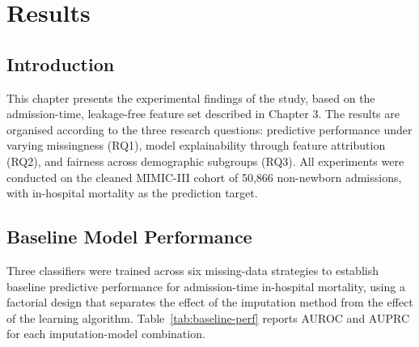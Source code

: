 \documentclass[12pt,a4paper]{report}
\begin{document}
\chapter{Results}

\section{Introduction}
This chapter presents the experimental findings of the study, based on the admission-time, leakage-free feature set described in Chapter 3. The results are organised according to the three research questions: predictive performance under varying missingness (RQ1), model explainability through feature attribution (RQ2), and fairness across demographic subgroups (RQ3). All experiments were conducted on the cleaned MIMIC-III cohort of 50,866 non-newborn admissions, with in-hospital mortality as the prediction target.


\section{Baseline Model Performance}
Three classifiers were trained across six missing-data strategies to establish baseline predictive performance for admission-time in-hospital mortality, using a factorial design that separates the effect of the imputation method from the effect of the learning algorithm. Table~\ref{tab:baseline-perf} reports AUROC and AUPRC for each imputation-model combination.
\end{document}
